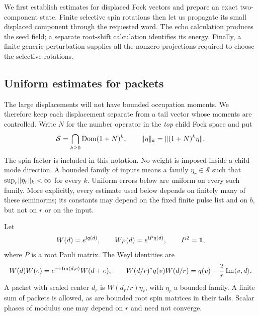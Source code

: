 We first establish estimates for displaced Fock vectors and prepare
an exact two-component state.  Finite selective spin rotations then let
us propagate its small displaced component through the requested word.
The echo calculation produces the seed field; a separate root-shift
calculation identifies its energy.  Finally, a finite generic
perturbation supplies all the nonzero projections required to choose
the selective rotations.

\subsection{Uniform estimates for packets}

The large displacements will not have bounded occupation moments.
We therefore keep each displacement separate from a tail vector
whose moments are controlled.  Write \(N\) for the number operator in
the \emph{top} child Fock space and put
\[
 \mathcal S=\bigcap_{k\geq0}\operatorname{Dom}(1+N)^k,
 \qquad \lVert \eta\rVert_k=\lVert (1+N)^k\eta\rVert.
\]
The spin factor is included in this notation.  No weight is imposed inside
a child-mode direction.  A bounded family of inputs means a family
\(\eta_r\in\mathcal S\) such that
\(\sup_r\lVert \eta_r\rVert_k<\infty\) for every \(k\).  Uniform errors below are
uniform on every such family.  More explicitly, every estimate used below
depends on finitely many of these seminorms; its constants may depend on
the fixed finite pulse list and on \(b\), but not on \(r\) or on the input.

Let
\[
 W(d)=e^{\mathrm i q(d)},\qquad
 W_P(d)=e^{\mathrm i Pq(d)},\qquad P^2=\mathbf 1,
\]
where \(P\) is a root Pauli matrix.  The Weyl identities are
\begin{equation}
\label{eq:seed-weyl}
 W(d)W(e)=e^{-\mathrm i\operatorname{Im}\langle d,e\rangle}W(d+e),
 \qquad
 W(d/r)^*q(v)W(d/r)
 =q(v)-\frac{2}{r}\operatorname{Im}\langle v,d\rangle.
\end{equation}
A packet with scaled center \(d_r\) is \(W(d_r/r)\eta_r\), with
\(\eta_r\) a bounded family.  A finite sum of packets is allowed, as are
bounded root spin matrices in their tails.  Scalar phases of modulus one
may depend on \(r\) and need not converge.

